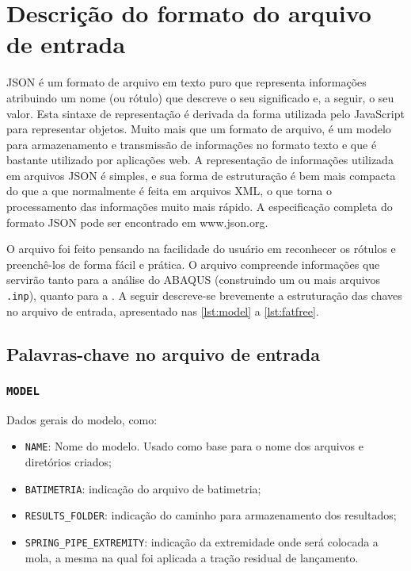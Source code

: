 \apendices
\renewcommand{\apendicesname}{AP\^ENDICE}
\partpage

\chapter{Descrição do formato do arquivo de entrada\label{apendice:json}}

JSON é um formato de arquivo em texto puro que representa informações atribuindo um nome (ou rótulo) que descreve o seu significado e, a seguir, o seu valor. Esta sintaxe de representação é derivada da forma utilizada pelo JavaScript para representar objetos. Muito mais que um formato de arquivo, é um modelo para armazenamento e transmissão de informações no formato texto e que é bastante utilizado por aplicações web. A representação de informações utilizada em arquivos JSON é simples, e sua forma de estruturação é bem mais compacta do que a que normalmente é feita em arquivos XML, o que torna o processamento das informações muito mais rápido. A especificação completa do formato JSON pode ser encontrado em www.json.org.

O arquivo foi feito pensando na facilidade do usuário em reconhecer os rótulos e preenchê-los de forma fácil e prática.
O arquivo compreende informações que servirão tanto para a análise do ABAQUS (construindo um ou mais arquivos \texttt{.inp}), quanto para a \fatfree.
A seguir descreve-se brevemente a estruturação das chaves no arquivo de entrada, apresentado nas \autoref{lst:model} a \autoref{lst:fatfree}.

\section*{Palavras-chave no arquivo de entrada}

\subsection{\texttt{MODEL}}

Dados gerais do modelo, como:

\begin{itemize}
  \item \texttt{NAME}: Nome do modelo. Usado como base para o nome dos arquivos e diretórios criados;
  \item \texttt{BATIMETRIA}: indicação do arquivo de batimetria;
  \item \texttt{RESULTS\_FOLDER}: indicação do caminho para armazenamento dos resultados;
  \item \texttt{SPRING\_PIPE\_EXTREMITY}: indicação da extremidade onde será colocada a mola, a mesma na qual foi aplicada a tração residual de lançamento.
\end{itemize}


